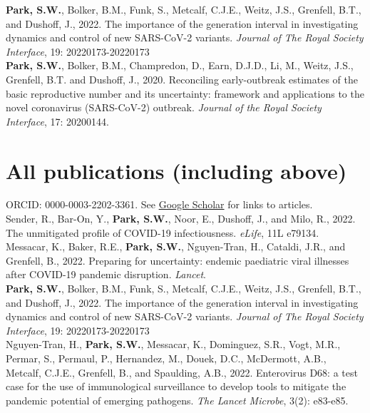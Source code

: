 \documentclass[11pt]{article} %
\begin{document}
 \textbf{Park, S.W.}, Bolker, B.M., Funk, S., Metcalf, C.J.E., Weitz, J.S., Grenfell, B.T., and Dushoff, J., 2022. The importance of the generation interval in investigating dynamics and control of new SARS-CoV-2 variants. \textit{Journal of The Royal Society Interface}, 19: 20220173-20220173\\

 \textbf{Park, S.W.}, Bolker, B.M., Champredon, D., Earn, D.J.D., Li, M., Weitz, J.S., Grenfell, B.T. and Dushoff, J., 2020. Reconciling early-outbreak estimates of the basic reproductive number and its uncertainty: framework and applications to the novel coronavirus (SARS-CoV-2) outbreak. \textit{Journal of the Royal Society Interface}, 17: 20200144.\\

\section*{All publications (including above)}

ORCID: 0000-0003-2202-3361. See \href{https://scholar.google.com/citations?user=ZSCrs78AAAAJ&hl=en&oi=ao}{Google Scholar} for links to articles.\\

 Sender, R., Bar-On, Y., \textbf{Park, S.W.}, Noor, E., Dushoff, J., and Milo, R., 2022. The unmitigated profile of COVID-19 infectiousness. \textit{eLife}, 11L e79134.\\

 Messacar, K., Baker, R.E., \textbf{Park, S.W.}, Nguyen-Tran, H., Cataldi, J.R., and Grenfell, B., 2022. Preparing for uncertainty: endemic paediatric viral illnesses after COVID-19 pandemic disruption. \textit{Lancet}.\\

 \textbf{Park, S.W.}, Bolker, B.M., Funk, S., Metcalf, C.J.E., Weitz, J.S., Grenfell, B.T., and Dushoff, J., 2022. The importance of the generation interval in investigating dynamics and control of new SARS-CoV-2 variants. \textit{Journal of The Royal Society Interface}, 19: 20220173-20220173\\

 Nguyen-Tran, H., \textbf{Park, S.W.}, Messacar, K., Dominguez, S.R., Vogt, M.R., Permar, S., Permaul, P., Hernandez, M., Douek, D.C., McDermott, A.B., Metcalf, C.J.E., Grenfell, B., and Spaulding, A.B., 2022. Enterovirus D68: a test case for the use of immunological surveillance to develop tools to mitigate the pandemic potential of emerging pathogens. \textit{The Lancet Microbe}, 3(2): e83-e85.\\
\end{document}
